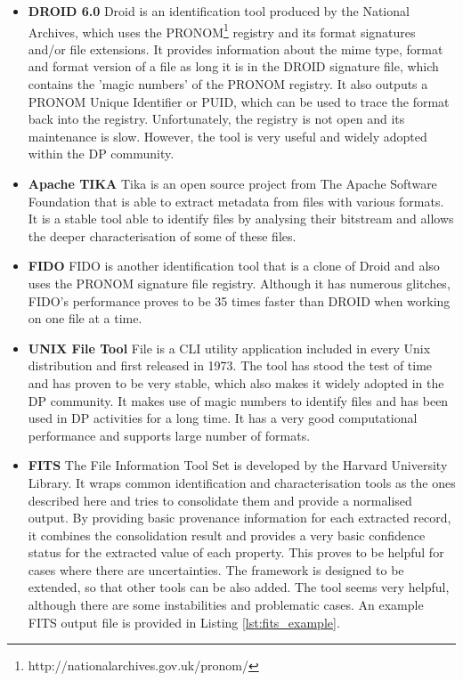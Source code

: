 \begin{itemize}
\item \textbf{DROID 6.0}\newline
Droid is an identification tool produced by the National Archives, which uses the PRONOM\footnote{http://nationalarchives.gov.uk/pronom/} registry and its format signatures and/or file extensions. It provides information about the mime type, format and format version of a file as long it is in the DROID signature file, which contains the 'magic numbers' of the PRONOM registry. It also outputs a PRONOM Unique Identifier or PUID, which can be used to trace the format back into the registry.
Unfortunately, the registry is not open and its maintenance is slow. However, the tool is very useful and widely adopted within the DP community.

\item \textbf{Apache TIKA}\newline
Tika is an open source project from The Apache Software Foundation that is able to extract metadata from files with various formats. It is a stable tool able to identify files by analysing their bitstream and allows the deeper characterisation of some of these files.  

\item \textbf{FIDO}\newline
FIDO is another identification tool that is a clone of Droid and also uses the PRONOM signature file registry. Although it has numerous glitches, FIDO's performance proves to be 35 times faster than DROID when working on one file at a time.

\item \textbf{UNIX File Tool}\newline
File is a CLI utility application included in every Unix distribution and first released in 1973. The tool has stood the test of time and has proven to be very stable, which also makes it widely adopted in the DP community. It makes use of magic numbers to identify files and has been used in DP activities for a long time. It has a very good computational performance and supports large number of formats.

\item \textbf{FITS} \newline
The File Information Tool Set is developed by the Harvard University Library. It wraps common identification and characterisation tools as the ones described here and tries to consolidate them and provide a normalised output. By providing basic provenance information for each extracted record, it combines the consolidation result and provides a very basic confidence status for the extracted value of each property. This proves to be helpful for cases where there are uncertainties. The framework is designed to be extended, so that other tools can be also added. The tool seems very helpful, although there are some instabilities and problematic cases. An example FITS output file is provided in Listing \ref{lst:fits_example}.


\end{itemize}

